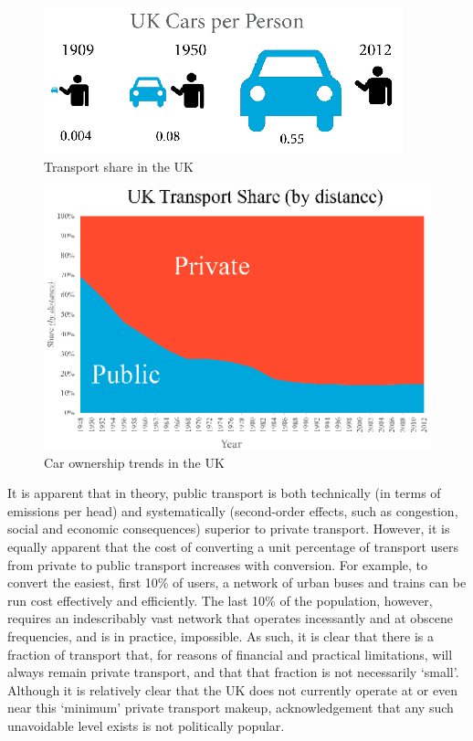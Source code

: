 \documentclass[conference]{IEEEtran}
\begin{document}
\begin{figure}[!htp]
\centering
\includegraphics[width=\columnwidth]{images/ukcarsperperson.png}
\caption{Transport share in the UK}
\label{fig:ukcarsperperson}
\end{figure}

\begin{figure}[!htp]
\centering
\includegraphics[width=\columnwidth]{images/uktransportshare.png}
\caption{Car ownership trends in the UK}
\label{fig:uktransportshare}
\end{figure}

It is apparent that in theory, public transport is both technically
(in terms of emissions per head) and systematically (second-order
effects, such as congestion, social and economic consequences)
superior to private transport. However, it is equally apparent that
the cost of converting a unit percentage of transport users from
private to public transport increases with conversion. For example, to
convert the easiest, first 10\% of users, a network of urban buses and
trains can be run cost effectively and efficiently. The last 10\% of
the population, however, requires an indescribably vast network that
operates incessantly and at obscene frequencies, and is in practice,
impossible. As such, it is clear that there is a fraction of transport
that, for reasons of financial and practical limitations, will always
remain private transport, and that that fraction is not necessarily
‘small’. Although it is relatively clear that the UK does not
currently operate at or even near this ‘minimum’ private transport
makeup, acknowledgement that any such unavoidable level exists is not
politically popular.
\end{document}
